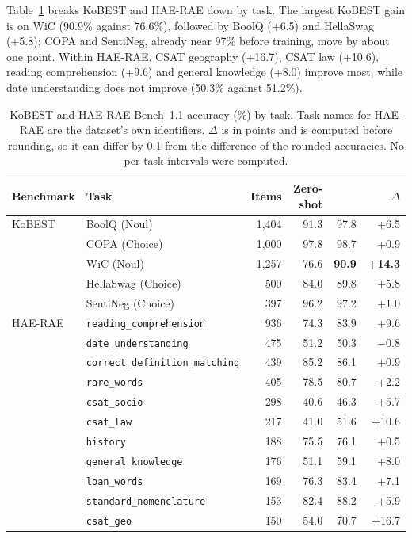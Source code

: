Table~\ref{tab:kbench_sub} breaks KoBEST and HAE-RAE down by task. The largest KoBEST gain is
on WiC (90.9\% against 76.6\%), followed by BoolQ (+6.5) and HellaSwag (+5.8); COPA and
SentiNeg, already near 97\% before training, move by about one point. Within HAE-RAE, CSAT
geography (+16.7), CSAT law (+10.6), reading comprehension (+9.6) and general knowledge (+8.0)
improve most, while date understanding does not improve (50.3\% against 51.2\%).

\begin{table}[t]
\centering
\small
\caption{KoBEST and HAE-RAE Bench~1.1 accuracy (\%) by task. Task names for HAE-RAE are the
dataset's own identifiers. $\Delta$ is in points and is computed before rounding, so it can
differ by 0.1 from the difference of the rounded accuracies. No per-task intervals were
computed.}
\label{tab:kbench_sub}
\begin{tabular}{@{}llrrrr@{}}
\toprule
Benchmark & Task & Items & Zero-shot & \expone{} & $\Delta$ \\
\midrule
KoBEST & BoolQ (Noul) & 1,404 & 91.3 & 97.8 & +6.5 \\
 & COPA (Choice) & 1,000 & 97.8 & 98.7 & +0.9 \\
 & WiC (Noul) & 1,257 & 76.6 & \textbf{90.9} & \textbf{+14.3} \\
 & HellaSwag (Choice) & 500 & 84.0 & 89.8 & +5.8 \\
 & SentiNeg (Choice) & 397 & 96.2 & 97.2 & +1.0 \\
\midrule
HAE-RAE & \texttt{reading\_comprehension} & 936 & 74.3 & 83.9 & +9.6 \\
 & \texttt{date\_understanding} & 475 & 51.2 & 50.3 & $-0.8$ \\
 & \texttt{correct\_definition\_matching} & 439 & 85.2 & 86.1 & +0.9 \\
 & \texttt{rare\_words} & 405 & 78.5 & 80.7 & +2.2 \\
 & \texttt{csat\_socio} & 298 & 40.6 & 46.3 & +5.7 \\
 & \texttt{csat\_law} & 217 & 41.0 & 51.6 & +10.6 \\
 & \texttt{history} & 188 & 75.5 & 76.1 & +0.5 \\
 & \texttt{general\_knowledge} & 176 & 51.1 & 59.1 & +8.0 \\
 & \texttt{loan\_words} & 169 & 76.3 & 83.4 & +7.1 \\
 & \texttt{standard\_nomenclature} & 153 & 82.4 & 88.2 & +5.9 \\
 & \texttt{csat\_geo} & 150 & 54.0 & 70.7 & +16.7 \\
\bottomrule
\end{tabular}
\end{table}

